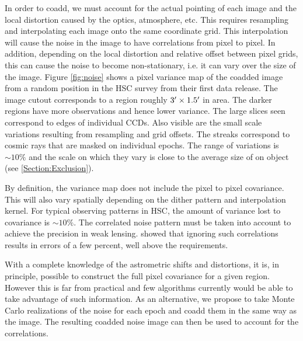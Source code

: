 \documentclass[fleqn,useAMS,usenatbib]{mnras}
\begin{document}
In order to coadd, we must account for the actual pointing of each image and 
the local distortion caused by the optics, atmosphere, etc.  This requires 
resampling and interpolating each image onto the same coordinate grid.  This 
interpolation will cause the noise in the image to have correlations from pixel 
to pixel.  In addition, depending on the local distortion and relative offset 
between pixel grids, this can cause the noise to become non-stationary, i.e. it 
can vary over the size of the image.  Figure \ref{fig:noise} shows a pixel 
variance map of the coadded image from a random position in the HSC survey 
\cite{HSC_DR1} from their first data release.  The image cutout corresponds to 
a region roughly $3\hbox{$^\prime$} \times 1.5\hbox{$^\prime$}$ in area.  The darker regions have 
more observations and hence lower variance.  The large slices seen correspond 
to edges of individual CCDs.  Also visible are the small scale variations 
resulting from resampling and grid offsets.  The streaks correspond to cosmic 
rays that are masked on individual epochs.  The range of variations is 
$\sim10\%$ and the scale on which they vary is close to the average size of on 
object (see \ref{Section:Exclusion}).

By definition, the variance map does not include the pixel to pixel covariance. 
This will also vary spatially depending on the dither pattern and 
interpolation kernel.  For typical observing patterns in HSC, the amount of 
variance lost to covariance is $\sim 10\%$.  The correlated noise pattern must be 
taken into account to achieve the precision in weak lensing. \cite{Gurvich2016} 
showed that ignoring such correlations results in errors of a few percent, well 
above the requirements.  

With a complete knowledge of the astrometric shifts and distortions, it is, in 
principle, possible to construct the full pixel covariance for a given region.  
However this is far from practical and few algorithms currently would be able 
to take advantage of such information.  As an alternative, we propose to take 
Monte Carlo realizations of the noise for each epoch and coadd them in the same 
way as the image.  The resulting coadded noise image can then be used to 
account for the correlations. 
\end{document}
